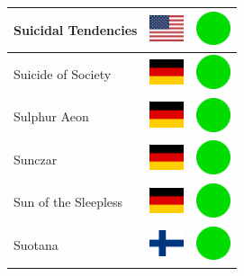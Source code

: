 \documentclass[12pt, a4paper, twoside]{report}
\begin{document}
\begin{center}
\begin{longtable}{|p{5cm}|p{2cm}|p{2cm}|}
 Suicidal Tendencies                                        & \includegraphics[width=1cm]{../img/flags/us} &   \includegraphics[width=1cm]{../likes/y} \\ \hline
 Suicide of Society                                         & \includegraphics[width=1cm]{../img/flags/de} &   \includegraphics[width=1cm]{../likes/y} \\ \hline
 Sulphur Aeon                                               & \includegraphics[width=1cm]{../img/flags/de} &   \includegraphics[width=1cm]{../likes/y} \\ \hline
 Sunczar                                                    & \includegraphics[width=1cm]{../img/flags/de} &   \includegraphics[width=1cm]{../likes/y} \\ \hline
 Sun of the Sleepless                                       & \includegraphics[width=1cm]{../img/flags/de} &   \includegraphics[width=1cm]{../likes/y} \\ \hline
 Suotana                                                    & \includegraphics[width=1cm]{../img/flags/fi} &   \includegraphics[width=1cm]{../likes/y} \\ \hline

\end{longtable}
\end{center}
\end{document}
